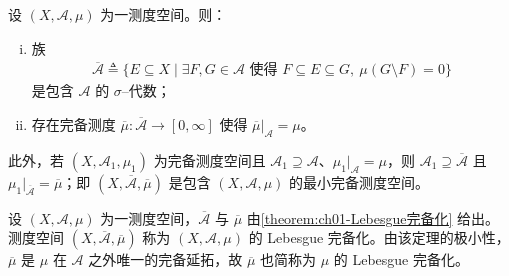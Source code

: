 \documentclass[../../main.tex]{subfiles}%
\begin{document}
\begin{theorem}\label{theorem:ch01-Lebesgue完备化}
设 $(X,\mathcal{A},\mu)$ 为一测度空间。则：
\begin{enumerate}[(i)]
\item 族
\begin{align}
\overline{\mathcal{A}}\triangleq \{E\subseteq X\mid\exists F,G\in\mathcal{A}\text{ 使得 }F\subseteq E\subseteq G,\ \mu(G\setminus F)=0\} \label{align:ch01-完备sigma代数}
\end{align}
是包含 $\mathcal{A}$ 的 $\sigma$--代数；
\item 存在完备测度 $\overline{\mu}:\overline{\mathcal{A}}\to[0,\infty]$ 使得 $\overline{\mu}|_{\mathcal{A}}=\mu$。
\end{enumerate}
此外，若 $(X,\mathcal{A}_1,\mu_1)$ 为完备测度空间且 $\mathcal{A}_1\supseteq\mathcal{A}$、$\mu_1|_{\mathcal{A}}=\mu$，则 $\mathcal{A}_1\supseteq\overline{\mathcal{A}}$ 且 $\mu_1|_{\overline{\mathcal{A}}}=\overline{\mu}$；即 $(X,\overline{\mathcal{A}},\overline{\mu})$ 是包含 $(X,\mathcal{A},\mu)$ 的最小完备测度空间。
\end{theorem}

\begin{definition}\label{definition:ch01-完备化}\label{definition:ch01-Lebesgue完备化}
设 $(X,\mathcal{A},\mu)$ 为一测度空间，$\overline{\mathcal{A}}$ 与 $\overline{\mu}$ 由\cref{theorem:ch01-Lebesgue完备化} 给出。测度空间 $(X,\overline{\mathcal{A}},\overline{\mu})$ 称为 $(X,\mathcal{A},\mu)$ 的 Lebesgue 完备化。由该定理的极小性，$\overline{\mu}$ 是 $\mu$ 在 $\mathcal{A}$ 之外唯一的完备延拓，故 $\overline{\mu}$ 也简称为 $\mu$ 的 Lebesgue 完备化。
\end{definition}
\end{document}
